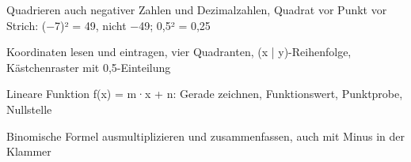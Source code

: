 \setcounter{aufgabe}{0}

\begin{aufgabe}{Quadrieren auch negativer Zahlen und Dezimalzahlen, Quadrat vor Punkt vor Strich: (−7)² = 49, nicht −49; 0,5² = 0,25}
\end{aufgabe}

\begin{aufgabe}{Koordinaten lesen und eintragen, vier Quadranten, (x | y)-Reihenfolge, Kästchenraster mit 0,5-Einteilung}
\end{aufgabe}

\begin{aufgabe}{Lineare Funktion f(x) = m·x + n: Gerade zeichnen, Funktionswert, Punktprobe, Nullstelle}
\end{aufgabe}

\begin{aufgabe}{Binomische Formel ausmultiplizieren und zusammenfassen, auch mit Minus in der Klammer}
\end{aufgabe}

